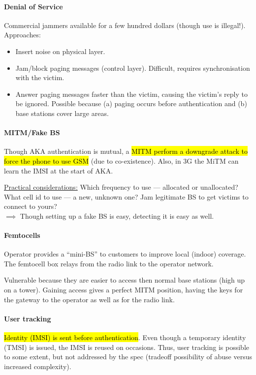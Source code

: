 \paragraph{Denial of Service}
Commercial jammers available for a few hundred dollars (though use is
illegal!). \\ Approaches:
\begin{itemize}
	\item Insert noise on physical layer.
	\item Jam/block paging messages (control layer). Difficult, requires synchronisation
	      with the victim.
	\item Answer paging messages faster than the victim, causing the victim's reply to be
	      ignored. Possible because (a) paging occurs before authentication and (b) base
	      stations cover large areas.
\end{itemize}

\paragraph{MITM/Fake BS}
Though AKA authentication is mutual, a \hl{MITM perform a downgrade attack to force
	the phone to use GSM} (due to co-existence). Also, in 3G the MiTM can learn the
IMSI at the start of AKA.

\underline{Practical considerations:}
Which frequency to use --- allocated or unallocated?
What cell id to use --- a new, unknown one?
Jam legitimate BS to get victims to connect to yours?
\\
$\implies$ Though setting up a fake BS is easy, detecting it is easy as well.

\paragraph{Femtocells}
Operator provides a ``mini-BS'' to customers to improve local (indoor)
coverage. The femtocell box relays from the radio link to the operator network.

Vulnerable because they are easier to access then normal base stations (high up
on a tower). Gaining access gives a perfect MITM position, having the keys for
the gateway to the operator as well as for the radio link.

\paragraph{User tracking}
\hl{Identity (IMSI) is sent before authentication}. Even though a temporary identity
(TMSI) is issued, the IMSI is reused on occasions. Thus, user tracking is
possible to some extent, but not addressed by the spec (tradeoff possibility of
abuse versus increased complexity).

